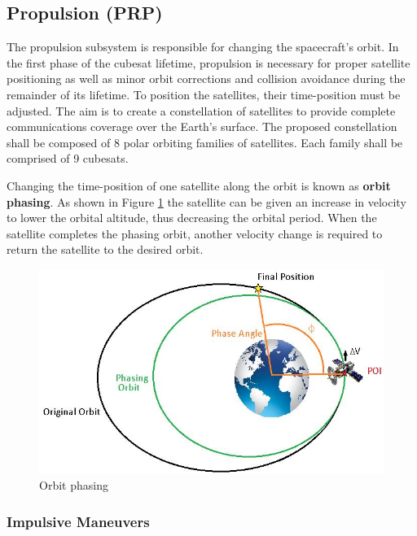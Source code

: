 \subsection{Propulsion (PRP)}

The propulsion subsystem is responsible for changing the spacecraft's orbit. In the first phase of the cubesat lifetime, propulsion is necessary for proper satellite positioning as well as minor orbit corrections and collision avoidance during the remainder of its lifetime. To position the satellites, their time-position must be  adjusted. The aim is to create a constellation of satellites to provide complete communications coverage over the Earth's surface. The proposed constellation shall be composed of 8 polar orbiting families of satellites. Each family shall be comprised of 9 cubesats.

Changing the time-position of one satellite along the orbit is known as \textbf{orbit phasing}. As shown in Figure \ref{fig:orbit_phasing} the satellite can be given an increase in velocity to lower the orbital altitude, thus decreasing the orbital period. When the satellite completes the phasing orbit, another velocity change is required to return the satellite to the desired orbit.

\begin{figure}[h!]
	\centering
	\includegraphics[scale=0.5]{img/Orbit_Phase.jpg}
	\caption[Graphical representation of orbit phasing technique]{Orbit phasing}
	\label{fig:orbit_phasing}
\end{figure}

\subsubsection{Impulsive Maneuvers} \label{Impulsive}

